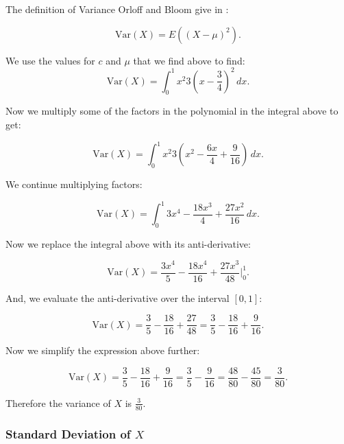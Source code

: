 \documentclass[a4paper,11pt]{article}
\begin{document}
The definition of Variance Orloff and Bloom give in \cite{reading6a}:

\begin{equation}
  \text{Var}\left(X \right) = E\left( \left( X-\mu\right)^2\right).
\end{equation}

We use the values for $c$ and $\mu$ that we find above to find:
\begin{equation}
  \text{Var}\left(X\right)=\int_0^1 x^{2}3\left(x-\frac{3}{4}\right)^2 \,dx.
\end{equation}

Now we multiply some of the factors in the polynomial in the integral above
to get:

\begin{equation}
  \text{Var}\left(X\right)=\int_0^1 x^{2}3\left(x^2-\frac{6x}{4}+\frac{9}{16}\right) \,dx.
\end{equation}


We continue multiplying factors:

\begin{equation}
  \text{Var}\left(X\right)=\int_0^1 3x^4-\frac{18x^3}{4}+\frac{27x^2}{16} \,dx.
\end{equation}


Now we replace the integral above with its anti-derivative:

\begin{equation}
  \text{Var}\left(X\right)= \frac{3x^4}{5}-\frac{18x^4}{16}+\frac{27x^3}{48} \bigg\rvert_0^1.
\end{equation}

And, we evaluate the anti-derivative over  the interval $\left[0, 1\right]$:

\begin{equation}
  \text{Var}\left(X\right)= \frac{3}{5}-\frac{18}{16}+\frac{27}{48}=\frac{3}{5}-\frac{18}{16}+\frac{9}{16}.
\end{equation}

Now we simplify the expression above further:

\begin{equation}
  \text{Var}\left(X\right)= \frac{3}{5}-\frac{18}{16}+\frac{9}{16}=\frac{3}{5}-\frac{9}{16}=\frac{48}{80}-\frac{45}{80}=\frac{3}{80}.
\end{equation}

Therefore the variance of $X$ is $\frac{3}{80}$.

\subsubsection{Standard Deviation of $X$}
\end{document}
